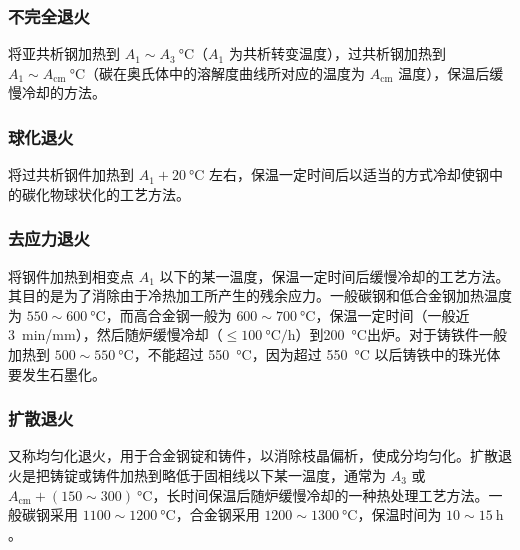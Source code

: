 \documentclass[a4paper,utf8]{article}
\begin{document}
        \subsubsection{不完全退火}
            将亚共析钢加热到 $A_1 \sim A_3~\unit{\degreeCelsius}$（$A_1$ 为共析转变温度），过共析钢加热到 $A_1 \sim A_{\textrm{cm}}~\unit{\degreeCelsius}$（碳在奥氏体中的溶解度曲线所对应的温度为 $A_{\textrm{cm}}$ 温度），保温后缓慢冷却的方法。
        \subsubsection{球化退火}
            将过共析钢件加热到 $A_1+20~\unit{\degreeCelsius}$ 左右，保温一定时间后以适当的方式冷却使钢中的碳化物球状化的工艺方法。
        \subsubsection{去应力退火}
            将钢件加热到相变点 $A_1$ 以下的某一温度，保温一定时间后缓慢冷却的工艺方法。其目的是为了消除由于冷热加工所产生的残余应力。一般碳钢和低合金钢加热温度为 $550 \sim 600~\unit{\degreeCelsius}$，而高合金钢一般为 $600 \sim 700~\unit{\degreeCelsius}$，保温一定时间（一般近 \SI{3}{\minute/\milli\metre}），然后随炉缓慢冷却（$\le \SI{100}{\degreeCelsius/\hour}$）到\SI{200}{\degreeCelsius}出炉。对于铸铁件一般加热到 $500 \sim 550~\unit{\degreeCelsius}$，不能超过 \SI{550}{\degreeCelsius}，因为超过 \SI{550}{\degreeCelsius} 以后铸铁中的珠光体要发生石墨化。
        \subsubsection{扩散退火}
            又称均匀化退火，用于合金钢锭和铸件，以消除枝晶偏析，使成分均匀化。扩散退火是把铸锭或铸件加热到略低于固相线以下某一温度，通常为 $A_3$ 或 $A_{\textrm{cm}} + (150 \sim 300)~\unit{\degreeCelsius}$，长时间保温后随炉缓慢冷却的一种热处理工艺方法。一般碳钢采用 $1100 \sim 1200~\unit{\degreeCelsius}$，合金钢采用 $1200 \sim 1300~\unit{\degreeCelsius}$，保温时间为 $10 \sim 15~\unit{\hour}$。
\end{document}

